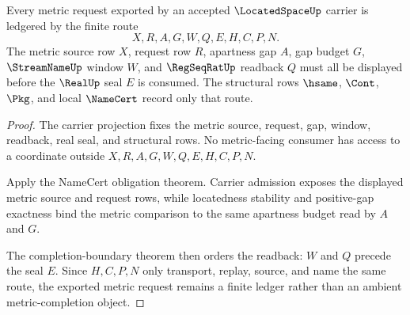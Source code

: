\begin{theorem}
\label{thm:located-space-metric-request-ledger}
Every metric request exported by an accepted $\LocatedSpaceUp$ carrier is ledgered by the finite route
$$
X,R,A,G,W,Q,E,H,C,P,N .
$$
The metric source row $X$, request row $R$, apartness gap $A$, gap budget $G$, $\StreamNameUp$ window $W$, and $\RegSeqRatUp$ readback $Q$ must all be displayed before the $\RealUp$ seal $E$ is consumed. The structural rows $\hsame$, $\Cont$, $\Pkg$, and local $\NameCert$ record only that route.
\end{theorem}
\begin{proof}
The carrier projection fixes the metric source, request, gap, window, readback, real seal, and structural rows. No metric-facing consumer has access to a coordinate outside $X,R,A,G,W,Q,E,H,C,P,N$.

Apply the NameCert obligation theorem. Carrier admission exposes the displayed metric source and request rows, while locatedness stability and positive-gap exactness bind the metric comparison to the same apartness budget read by $A$ and $G$.

The completion-boundary theorem then orders the readback: $W$ and $Q$ precede the seal $E$. Since $H,C,P,N$ only transport, replay, source, and name the same route, the exported metric request remains a finite ledger rather than an ambient metric-completion object.
\end{proof}

